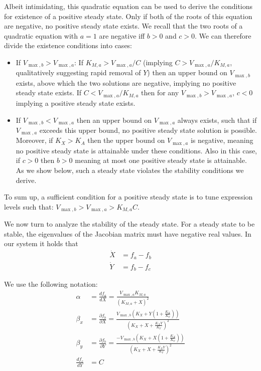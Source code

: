     Albeit intimidating, this quadratic equation can be used to derive the conditions for existence of a positive steady state.
    Only if both of the roots of this equation are negative, no positive steady state exists.
    We recall that the two roots of a quadratic equation with $a=1$ are negative iff $b>0$ and $c>0$.
    We can therefore divide the existence conditions into cases:
    \begin{itemize}
        \item If $V_{\max,b}>V_{\max,a}$: If $K_{M,a}>V_{\max,a}/C$ (implying $C>V_{\max,a}/K_{M,a}$, qualitatively suggesting rapid removal of $Y$) then an upper bound on $V_{\max,b}$ exists, above which the two solutions are negative, implying no positive steady state exists.
            If $C<V_{\max,a}/K_{M,a}$ then for any $V_{\max,b}>V_{\max,a}$, $c<0$ implying a positive steady state exists.
        \item If $V_{\max,b}<V_{\max,a}$ then an upper bound on $V_{\max,a}$ always exists, such that if $V_{\max,a}$ exceeds this upper bound, no positive steady state solution is possible.
            Moreover, if $K_X>K_A$ then the upper bound on $V_{\max,a}$ is negative, meaning no positive steady state is attainable under these conditions.
            Also in this case, if $c>0$ then $b>0$ meaning at most one positive steady state is attainable.
            As we show below, such a steady state violates the stability conditions we derive.
    \end{itemize}
    To sum up, a sufficient condition for a positive steady state is to tune expression levels such that: $V_{\max,b}>V_{\max,a}>K_{M,a}C$.
    
    We now turn to analyze the stability of the steady state.
    For a steady state to be stable, the eigenvalues of the Jacobian matrix must have negative real values.
    In our system it holds that
    \begin{align*}
        \dot{X} & =f_a-f_b \\
        \dot{Y} & =f_b-f_c
    \end{align*}

 We use the following notation:
\begin{align*}
  \alpha & =\frac{df_a}{dX}=\frac{V_{\max,a}K_{M,a}}{(K_{M,a}+X)^2} \\
  \beta_x & =\frac{\partial f_b}{\partial X}= \frac{V_{\max,b}(K_X+Y(1+\frac{K_X}{K_Y}))}{(K_X+X+\frac{K_XY}{K_Y})^2}
\\
  \beta_y & =\frac{\partial f_b}{\partial Y}= \frac{-V_{\max,b}(K_X+X(1+\frac{K_X}{K_Y}))}{(K_X+X+\frac{K_XY}{K_Y})^2} \\
  \frac{df_c}{dY}&=C
\end{align*}

